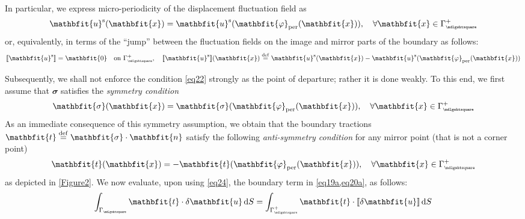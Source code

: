 \documentclass[12pt,a4paper]{article}
\renewcommand{\ta}[1]{\mathbfit{#1}}
\renewcommand{\ts}[1]{\mathbfit{#1}}
\renewcommand{\Box}{\mdlgwhtsquare}
\DeclarePairedDelimiter{\jmp}{[\![}{]\!]}
\newcommand{\per}{\mathrm{per}}
\newcommand{\rve}{
  {\mathchoice
   {\mbox{\scalebox{0.67}{$\Box$}}}
   {\mbox{\scalebox{0.67}{$\Box$}}}
   {\mbox{\scalebox{0.5}{$\Box$}}}
   {\mbox{\scalebox{0.375}{$\Box$}}}
  }
}
\begin{document}
In particular, we express micro-periodicity of the displacement fluctuation field as
\begin{equation}
    \ta{u}^\fluct(\ta{x}) = \ta{u}^\fluct(\ta{\varphi}_\per(\ta{x})), \quad
    \forall \ta{x}\in\Gamma_\rve^+
\label{eq21}
\end{equation}
or, equivalently, in terms of the ``jump'' between the fluctuation fields on the image and mirror parts of the boundary as follows:
\begin{equation}
    \jmp{\ta{u}^\fluct} = \ta{0} \quad \makebox{on } \Gamma_\rve^+, \quad
    \jmp{\ta{u}^\fluct}(\ta{x}) \defeq \ta{u}^\fluct(\ta{x})-\ta{u}^\fluct(\ta{\varphi}_\per(\ta{x}))
\label{eq22}
\end{equation}

Subsequently, we shall not enforce the condition \cref{eq22} strongly as the point of departure; rather it is done weakly.
To this end, we first assume that $\ts{\sigma}$ satisfies the \emph{symmetry condition}
\begin{equation}
    \ts{\sigma}(\ta{x}) = \ts{\sigma}(\ta{\varphi}_\per(\ta{x})), \quad
    \forall \ta{x}\in\Gamma_\rve^+
\label{eq23}
\end{equation}
As an immediate consequence of this symmetry assumption, we obtain that the boundary tractions $\ta{t}\defeq\ts{\sigma}\cdot\ta{n}$ satisfy the following \emph{anti-symmetry condition} for any mirror point (that is not a corner point)
\begin{equation}
    \ta{t}(\ta{x}) = -\ta{t}(\ta{\varphi}_\per(\ta{x})), \quad
    \forall \ta{x}\in\Gamma_\rve^+
\label{eq24}
\end{equation}
as depicted in \cref{Figure2}.
We now evaluate, upon using \cref{eq24}, the boundary term in
\cref{eq19a,eq20a}, as follows:
\begin{equation}
    \int_{\Gamma_\rve} \ta{t} \cdot \delta \ta{u} \dif S =
    \int_{\Gamma_\rve^+} \ta{t} \cdot \jmp{\delta \ta{u}} \dif S
\label{eq25}
\end{equation}
\end{document}
